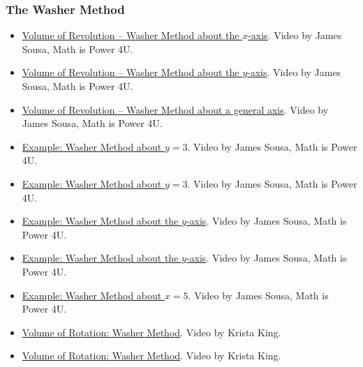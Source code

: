 \subsubsection{The Washer Method}
\label{sss:thew-7078}

\begin{itemize}

\item \href{https://www.youtube.com/watch?v=rbqWHbxmVUI}{Volume of Revolution – Washer Method about the $x$-axis}.  
Video by James Sousa, Math is Power 4U.

\item \href{https://www.youtube.com/watch?v=8gbphumzbSI}{Volume of Revolution – Washer Method about the $y$-axis}.  
Video by James Sousa, Math is Power 4U.

\item \href{https://www.youtube.com/watch?v=_FF3CM5MNe8}{Volume of Revolution – Washer Method about a general axis}.  
Video by James Sousa, Math is Power 4U.

\item \href{https://www.youtube.com/watch?v=6zaqRVD90mY}{Example: Washer Method about $y=3$}.  
Video by James Sousa, Math is Power 4U.

\item \href{https://www.youtube.com/watch?v=kivhB247H-c}{Example: Washer Method about $y=3$}.  
Video by James Sousa, Math is Power 4U.

\item \href{https://www.youtube.com/watch?v=IWoEivm5AqM}{Example: Washer Method about the $y$-axis}.  
Video by James Sousa, Math is Power 4U.

\item \href{https://www.youtube.com/watch?v=kkVVOStqRmI}{Example: Washer Method about the $y$-axis}.  
Video by James Sousa, Math is Power 4U.

\item \href{https://www.youtube.com/watch?v=2yd_Ae-7wls}{Example: Washer Method about $x=5$}.  
Video by James Sousa, Math is Power 4U.

\item \href{https://www.youtube.com/watch?v=zHi1qtf4pGg}{Volume of Rotation: Washer Method}.  
Video by Krista King.

\item \href{https://www.youtube.com/watch?v=Sg24zkhG0Vw}{Volume of Rotation: Washer Method}.  
Video by Krista King.


\end{itemize}
